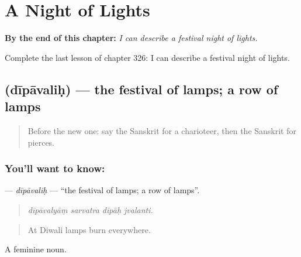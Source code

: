 
\chapter{A Night of Lights}
\label{ch:sa-a-night-of-lights}

\begin{chapteropening}
\textbf{By the end of this chapter:} \emph{I can describe a festival night of lights.}

Complete the last lesson of chapter 326: I can describe a festival night of lights.
\end{chapteropening}

\section[\texorpdfstring{\sk{दीपावलिः} (dīpāvaliḥ)}{दीपावलिः (dīpāvaliḥ)}]{ (dīpāvaliḥ) — the festival of lamps; a row of lamps}

\label{lesson:SA-C326-dipavalih}



\begin{quote}
Before the new one: say the Sanskrit for a charioteer, then the Sanskrit for pierces.
\end{quote}

\subsection*{You'll want to know: }
\textbf{} — \emph{dīpāvaliḥ} — \textquotedblleft{}the festival of lamps; a row of lamps\textquotedblright{}.

\begin{quote}
   
\end{quote}

\begin{quote}
\emph{dīpāvalyāṃ sarvatra dīpāḥ jvalanti.}
\end{quote}

\begin{quote}
At Diwali lamps burn everywhere.
\end{quote}

A feminine noun.

